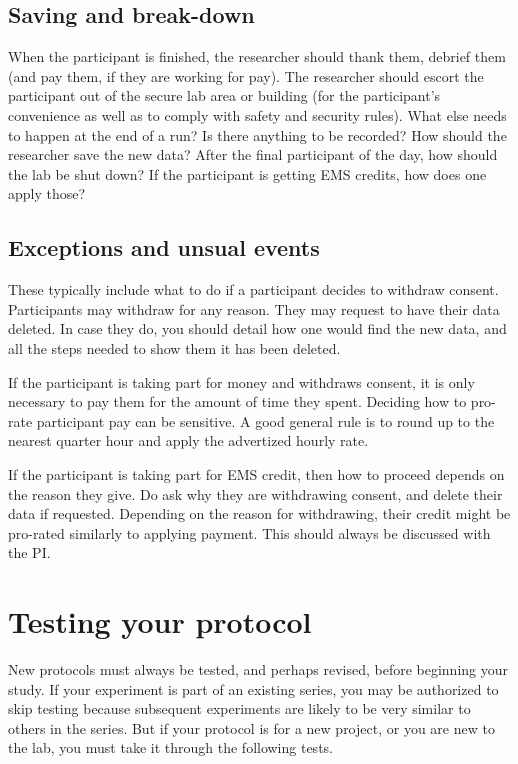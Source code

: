 \documentclass[
  12pt,
]{book}
\begin{document}
\subsection{Saving and break-down}\label{saving-and-break-down}

When the participant is finished, the researcher should thank them, debrief them (and pay them, if they are working for pay). The researcher should escort the participant out of the secure lab area or building (for the participant's convenience as well as to comply with safety and security rules). What else needs to happen at the end of a run? Is there anything to be recorded? How should the researcher save the new data? After the final participant of the day, how should the lab be shut down? If the participant is getting EMS credits, how does one apply those?

\subsection{Exceptions and unsual events}\label{exceptions-and-unsual-events}

These typically include what to do if a participant decides to withdraw consent. Participants may withdraw for any reason. They may request to have their data deleted. In case they do, you should detail how one would find the new data, and all the steps needed to show them it has been deleted.

If the participant is taking part for money and withdraws consent, it is only necessary to pay them for the amount of time they spent. Deciding how to pro-rate participant pay can be sensitive. A good general rule is to round up to the nearest quarter hour and apply the advertized hourly rate.

If the participant is taking part for EMS credit, then how to proceed depends on the reason they give. Do ask why they are withdrawing consent, and delete their data if requested. Depending on the reason for withdrawing, their credit might be pro-rated similarly to applying payment. This should always be discussed with the PI.

\section{Testing your protocol}\label{testing-your-protocol}

New protocols must always be tested, and perhaps revised, before beginning your study. If your experiment is part of an existing series, you may be authorized to skip testing because subsequent experiments are likely to be very similar to others in the series. But if your protocol is for a new project, or you are new to the lab, you must take it through the following tests.
\end{document}
